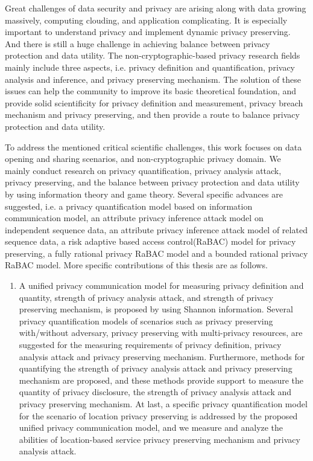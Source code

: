 \begin{englishabstract}
	Great challenges of data security and privacy are arising along with data growing massively, computing clouding, and application complicating. It is especially important to understand privacy and implement dynamic privacy preserving. And there is still a huge challenge in achieving balance between privacy protection and data utility. The non-cryptographic-based privacy research fields mainly include three aspects, i.e. privacy definition and quantification, privacy analysis and inference, and privacy preserving mechanism. The solution of these issues can help the community to improve its basic theoretical foundation, and provide solid scientificity for privacy definition and measurement, privacy breach mechanism and privacy preserving, and then provide a
	route to balance privacy protection and data utility. 
	
	To address the mentioned critical scientific challenges, this work focuses on data opening and sharing scenarios, and non-cryptographic privacy domain. We mainly conduct research on privacy quantification, privacy analysis attack, privacy preserving, and the balance between privacy protection and data utility by using information theory and game theory. Several specific advances are suggested, i.e. a privacy quantification model based on information communication model, an attribute privacy inference attack model on independent sequence data, an attribute privacy inference attack model of related sequence data, a risk adaptive based access control(RaBAC) model for privacy preserving, a fully rational privacy RaBAC model and a bounded rational privacy RaBAC model. More specific contributions of this thesis are as follows.
	\begin{enumerate}
		\item 	
		A unified privacy communication model for measuring privacy definition and quantity, strength of privacy analysis attack, and strength of privacy preserving mechanism, is proposed by using Shannon information. 
		Several privacy quantification models of scenarios such as privacy preserving with/without adversary, privacy preserving with multi-privacy resources, are suggested for the measuring requirements of privacy definition, privacy analysis attack and privacy preserving mechanism. Furthermore, methods for quantifying the strength of  privacy analysis attack and privacy preserving mechanism are proposed, and these methods provide support to measure the quantity of privacy disclosure, the strength of  privacy analysis attack and privacy preserving mechanism. At last, a specific privacy quantification model for the scenario of location privacy preserving is addressed by the proposed unified privacy communication model, and we measure and analyze the abilities of location-based service privacy preserving mechanism and privacy analysis attack.
		

\end{enumerate}
\end{englishabstract}
